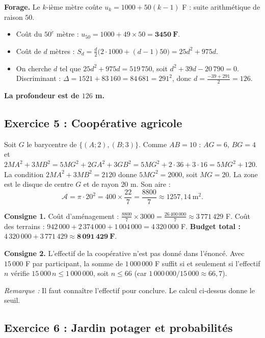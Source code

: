 \documentclass[11pt,a4paper]{article}
\newenvironment{rem}{\par\medskip\noindent\textit{Remarque :}\quad}{\par\medskip}
\begin{document}
\medskip\noindent\textbf{Forage.} Le $k$-i\`eme m\`etre co\^ute $u_k=1000+50(k-1)$ F : suite arithm\'etique de raison $50$.
\begin{itemize}
  \item Co\^ut du $50^{\grave e}$ m\`etre : $u_{50}=1000+49\times50=\mathbf{3450\ F}$.
  \item Co\^ut de $d$ m\`etres : $\displaystyle S_d=\frac{d}{2}\bigl(2\cdot1000+(d-1)50\bigr)=25d^2+975d$.
  \item On cherche $d$ tel que $25d^2+975d=519\,750$, soit $d^2+39d-20\,790=0$.
  Discriminant : $\Delta=1521+83\,160=84\,681=291^2$, donc $d=\frac{-39+291}{2}=126$.
\end{itemize}
\textbf{La profondeur est de $126$ m.}

\subsection{Exercice 5 : Coop\'erative agricole}

Soit $G$ le barycentre de $\{(A;2),(B;3)\}$. Comme $AB=10$ : $AG=6$, $BG=4$ et
$2MA^2+3MB^2=5MG^2+2GA^2+3GB^2=5MG^2+2\cdot36+3\cdot16=5MG^2+120$.
La condition $2MA^2+3MB^2=2120$ donne $5MG^2=2000$, soit $MG=20$.
La zone est le disque de centre $G$ et de rayon $20$ m. Son aire :
\[
\mathcal A=\pi\cdot20^2=400\times\frac{22}{7}=\frac{8800}{7}\approx 1257{,}14\ \text{m}^2.
\]

\medskip\noindent\textbf{Consigne 1.} Co\^ut d'am\'enagement : $\frac{8800}{7}\times 3000=\frac{26\,400\,000}{7}\approx 3\,771\,429$ F.
Co\^ut des terrains : $942\,000+2\,374\,000+1\,004\,000=4\,320\,000$ F.
\textbf{Budget total :} $4\,320\,000+3\,771\,429\approx \mathbf{8\,091\,429\ F}$.

\medskip\noindent\textbf{Consigne 2.} L'effectif de la coop\'erative n'est pas donn\'e dans l'\'enonc\'e.
Avec $15\,000$ F par participant, la somme de $1\,000\,000$ F suffit si et seulement si l'effectif $n$ v\'erifie
$15\,000\,n\le 1\,000\,000$, soit $n\le 66$ (car $1\,000\,000/15\,000\approx 66{,}7$).
\begin{rem} Il faut conna\^itre l'effectif pour conclure. Le calcul ci-dessus donne le seuil.\end{rem}

\subsection{Exercice 6 : Jardin potager et probabilit\'es}
\end{document}
